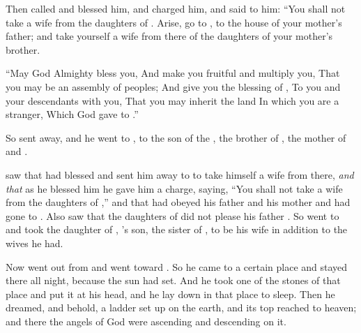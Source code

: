 
\bverse Then \Isaac called \Jacob and blessed him, and charged him, and said to him: ``You shall not take a wife from the daughters of \Canaan.
\bverse Arise, go to \PadanAram, to the house of  your mother's father; and take yourself a wife from there of the daughters of \Laban your mother's brother.
\begin{bquotation}
\bverse ``May God Almighty bless you, And make you fruitful and multiply you, That you may be an assembly of peoples; \bverse And give you the blessing of \Abraham, To you and your descendants with you, That you may inherit the land In which you are a stranger, Which God gave to \Abraham.''
\end{bquotation}
\bverse So \Isaac sent \Jacob away, and he went to \PadanAram, to \Laban the son of  the , the brother of \Rebekah, the mother of \Jacob and \Esau.


\bverse \Esau saw that \Isaac had blessed \Jacob and sent him away to \PadanAram to take himself a wife from there, \textit{and that} as he blessed him he gave him a charge, saying, ``You shall not take a wife from the daughters of \Canaan,''
\bverse and that \Jacob had obeyed his father and his mother and had gone to \PadanAram.
\bverse Also \Esau saw that the daughters of \Canaan did not please his father \Isaac.
\bverse So \Esau went to \Ishmael and took  the daughter of \Ishmael, \Abraham's son, the sister of , to be his wife in addition to the wives he had.


\bverse Now \Jacob went out from \Beersheba and went toward \Haran.
\bverse So he came to a certain place and stayed there all night, because the sun had set. And he took one of the stones of that place and put it at his head, and he lay down in that place to sleep.
\bverse Then he dreamed, and behold, a ladder \was set up on the earth, and its top reached to heaven; and there the angels of God were ascending and descending on it.

